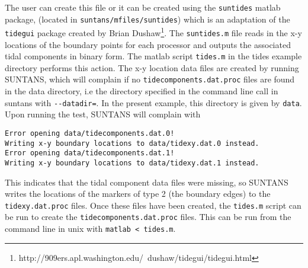 The user can create this file or it can be created using the \verb+suntides+ matlab package,
(located in \verb+suntans/mfiles/suntides+)
which is an adaptation of the \verb+tidegui+ package created by Brian Dushaw\footnote{
http://909ers.apl.washington.edu/~dushaw/tidegui/tidegui.html}.
The \verb+suntides.m+ file reads in the x-y locations of the boundary points for each processor
and outputs the associated tidal components in binary form.  The matlab script \verb+tides.m+ 
in the tides example directory performs this action.  The x-y location data files are created
by running SUNTANS, which will complain if no \verb+tidecomponents.dat.proc+ files are found
in the data directory, i.e the directory specified in the command line call in suntans with
\verb+--datadir=+.  In the present example, this directory is given by 
\verb+data+.  Upon running the test, SUNTANS will complain with
\begin{verbatim}
Error opening data/tidecomponents.dat.0!
Writing x-y boundary locations to data/tidexy.dat.0 instead.
Error opening data/tidecomponents.dat.1!
Writing x-y boundary locations to data/tidexy.dat.1 instead.
\end{verbatim}
This indicates that the tidal component data files were missing, so SUNTANS writes the locations
of the markers of type 2 (the boundary edges) to the \verb+tidexy.dat.proc+ files.  Once these
files have been created, the \verb+tides.m+ script can be run to create the \verb+tidecomponents.dat.proc+ files.
This can be run from the command line in unix with \verb+matlab < tides.m+.

